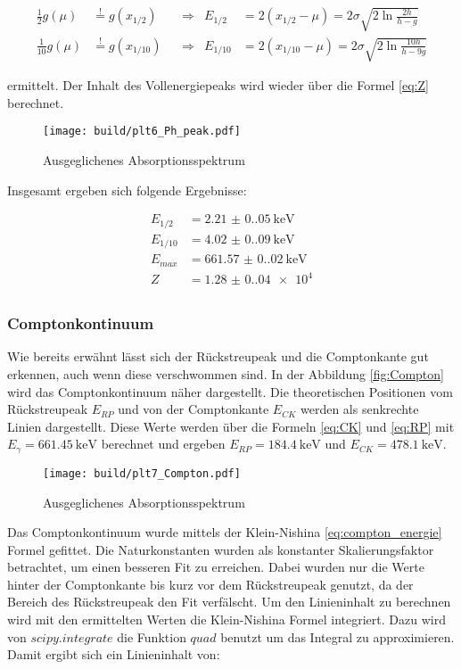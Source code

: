 \begin{align*}
	\frac{1}{2}g(\mu)  & \stackrel{!}{=}g(x_{1/2})  &  & \Rightarrow & E_{1/2}  & =2(x_{1/2}-\mu)=2\sigma \sqrt{2 \ln{\frac{2h}{h-g}}}    \\
	\frac{1}{10}g(\mu) & \stackrel{!}{=}g(x_{1/10}) &  & \Rightarrow & E_{1/10} & =2(x_{1/10}-\mu)=2\sigma \sqrt{2 \ln{\frac{10h}{h-9g}}}
\end{align*}

ermittelt. Der Inhalt des Vollenergiepeaks wird wieder über die Formel
\eqref{eq:Z} berechnet.

\begin{figure}[H]
	\centering
	\texttt{[image: build/plt6\_Ph\_peak.pdf]}
	\caption{Ausgeglichenes Absorptionsspektrum}
	\label{fig:Cs_peak}
\end{figure}

Insgesamt ergeben sich folgende Ergebnisse:

\begin{align*}
	E_{1/2}  & =\qty{2.21(0.05)}{\kilo\eV}   \\
	E_{1/10} & =\qty{4.02(0.09)}{\kilo\eV}   \\
	E_{max}  & =\qty{661.57(0.02)}{\kilo\eV} \\
	Z        & =\num{1.28(0.04)e4}           \\
\end{align*}

\subsubsection{Comptonkontinuum}
Wie bereits erwähnt lässt sich der Rückstreupeak und die Comptonkante gut
erkennen, auch wenn diese verschwommen sind. In der Abbildung
\eqref{fig:Compton} wird das Comptonkontinuum näher dargestellt. Die
theoretischen Positionen vom Rückstreupeak $E_{RP}$ und von der Comptonkante
$E_{CK}$ werden als senkrechte Linien dargestellt. Diese Werte werden über die
Formeln \eqref{eq:CK} und \eqref{eq:RP} mit $E_{\gamma}=\qty{661.45}{\kilo\eV}$
berechnet und ergeben $E_{RP}=\qty{184.4}{\kilo\eV}$ und
$E_{CK}=\qty{478.1}{\kilo\eV}$.

\begin{figure}[H]
	\centering
	\texttt{[image: build/plt7\_Compton.pdf]}
	\caption{Ausgeglichenes Absorptionsspektrum}
	\label{fig:Compton}
\end{figure}

Das Comptonkontinuum wurde mittels der Klein-Nishina \eqref{eq:compton_energie}
Formel gefittet. Die Naturkonstanten wurden als konstanter Skalierungsfaktor
betrachtet, um einen besseren Fit zu erreichen. Dabei wurden nur die Werte
hinter der Comptonkante bis kurz vor dem Rückstreupeak genutzt, da der Bereich
des Rückstreupeak den Fit verfälscht. Um den Linieninhalt zu berechnen wird
mit den ermittelten Werten die Klein-Nishina Formel integriert. Dazu wird von
$scipy.integrate$ \cite{scipy} die Funktion $quad$ benutzt um das Integral zu
approximieren. Damit ergibt sich ein Linieninhalt von:

